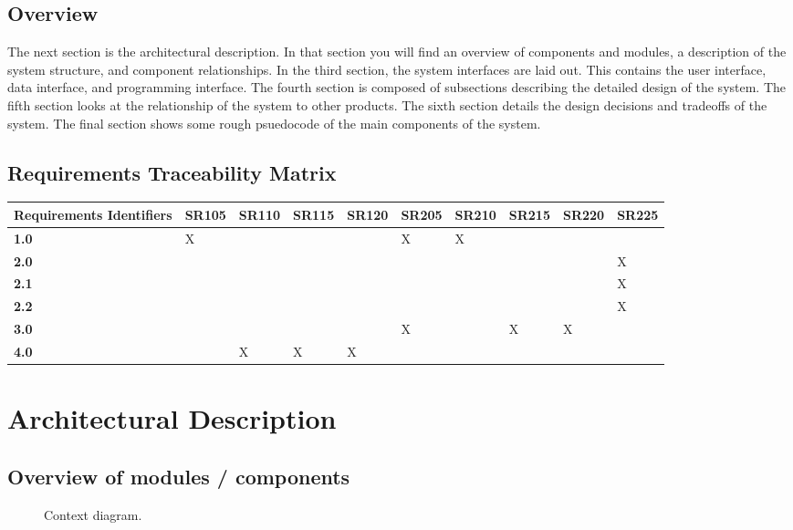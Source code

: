 \documentclass{article}
\begin{document}
\subsection{Overview}
The next section is the architectural description. In that section you will find an overview of components and modules, a description of the system structure, and component relationships. In the third section, the system interfaces are laid out. This contains the user interface, data interface, and programming interface. The fourth section is composed of subsections describing the detailed design of the system. The fifth section looks at the relationship of the system to other products. The sixth section details the design decisions and tradeoffs of the system. The final section shows some rough psuedocode of the main components of the system.

\subsection{Requirements Traceability Matrix}
\begin{tabular}{ | l | l | l | l | l | l | l | l | l | l |}
\hline
\textbf{Requirements Identifiers} & SR105 & SR110 & SR115 & SR120 & SR205 & SR210 & SR215 & SR220 & SR225 \\ \hline
\textbf{1.0} & X &  &  &  & X & X &  &  & \\ \hline
\textbf{2.0} &  &  &  & &  &  &  &  & X \\ \hline
\textbf{2.1} &  &  &  & &  &  &  &  & X \\ \hline
\textbf{2.2} &  &  &  & &  &  &  &  & X \\ \hline
\textbf{3.0} &  &  &  &  & X &  & X & X & \\ \hline
\textbf{4.0} &  & X & X & X &  &  &  &  & \\ \hline
\end{tabular}

\newpage

\section{Architectural Description}

\subsection{Overview of modules / components}

\begin{figure}[h!]
    \centering
    \resizebox{\textwidth}{!}{
        
    }
    \caption{Context diagram.}
    \label{fig:dfd-context}
\end{figure}
\end{document}
